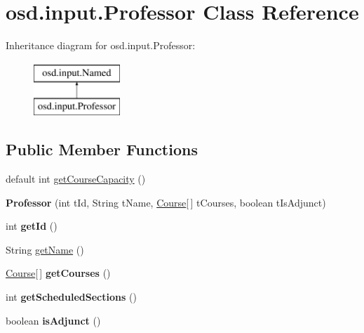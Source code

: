 \hypertarget{interfaceosd_1_1input_1_1_professor}{\section{osd.\-input.\-Professor Class Reference}
\label{interfaceosd_1_1input_1_1_professor}
}
Inheritance diagram for osd.\-input.\-Professor\-:\begin{figure}[H]
\begin{center}
\leavevmode
\includegraphics[height=2.000000cm]{interfaceosd_1_1input_1_1_professor}
\end{center}
\end{figure}
\subsection*{Public Member Functions}
\begin{DoxyCompactItemize}
\item 
default int \hyperlink{interfaceosd_1_1input_1_1_professor_a61a4ffd17d3360fbcc52c021aaf3f752}{get\-Course\-Capacity} ()
\item 
\hypertarget{interfaceosd_1_1input_1_1_professor_aa4ae8d22fffce4414523a44a7b240892}{{\bfseries Professor} (int t\-Id, String t\-Name, \hyperlink{interfaceosd_1_1input_1_1_course}{Course}\mbox{[}$\,$\mbox{]} t\-Courses, boolean t\-Is\-Adjunct)}\label{interfaceosd_1_1input_1_1_professor_aa4ae8d22fffce4414523a44a7b240892}

\item 
\hypertarget{interfaceosd_1_1input_1_1_professor_af095dc27a8f6709cd9eb3379d29db8f4}{int {\bfseries get\-Id} ()}\label{interfaceosd_1_1input_1_1_professor_af095dc27a8f6709cd9eb3379d29db8f4}

\item 
String \hyperlink{interfaceosd_1_1input_1_1_professor_a2abdc30a0e45099e3d0dedf7ae303a58}{get\-Name} ()
\item 
\hypertarget{interfaceosd_1_1input_1_1_professor_a97280839a452c7b0697547e7854b4458}{\hyperlink{interfaceosd_1_1input_1_1_course}{Course}\mbox{[}$\,$\mbox{]} {\bfseries get\-Courses} ()}\label{interfaceosd_1_1input_1_1_professor_a97280839a452c7b0697547e7854b4458}

\item 
\hypertarget{interfaceosd_1_1input_1_1_professor_a40ad65f1dc4528a9d67621367156458b}{int {\bfseries get\-Scheduled\-Sections} ()}\label{interfaceosd_1_1input_1_1_professor_a40ad65f1dc4528a9d67621367156458b}

\item 
\hypertarget{interfaceosd_1_1input_1_1_professor_adfc653b2b31e44689db9e5c7b194ebbb}{boolean {\bfseries is\-Adjunct} ()}\label{interfaceosd_1_1input_1_1_professor_adfc653b2b31e44689db9e5c7b194ebbb}

\end{DoxyCompactItemize}


